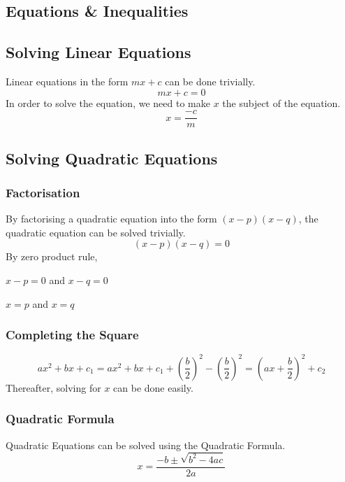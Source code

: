 \documentclass{report}
\begin{document}
\begin{flushleft}
\section{Equations \& Inequalities}

\subsection{Solving Linear Equations}
Linear equations in the form $mx+c$ can be done trivially.
\begin{equation}
    mx+c=0
\end{equation}
In order to solve the equation, we need to make $x$ the subject of the equation.
\begin{equation}
    x=\frac{-c}{m}
\end{equation}

\subsection{Solving Quadratic Equations}
\subsubsection{Factorisation}
By factorising a quadratic equation into the form $(x-p)(x-q)$, the quadratic equation can be solved trivially.
\[
    (x-p)(x-q) = 0
\]
By zero product rule,
\begin{center}
    $x-p=0$ and $x-q=0$ \par
    $x=p$ and $x=q$
\end{center}

\subsubsection{Completing the Square}
\begin{equation}
ax^2+bx+c_1=ax^2+bx+c_1+\left(\frac{b}{2}\right)^2-\left(\frac{b}{2}\right)^2=\left(ax+\frac{b}{2}\right)^2+c_2
\end{equation}
Thereafter, solving for $x$ can be done easily.\par

\subsubsection{Quadratic Formula}
Quadratic Equations can be solved using the Quadratic Formula.
\begin{equation}
    x=\frac{-b\pm\sqrt{b^2-4ac}}{2a}
\end{equation}


\end{flushleft}
\end{document}
